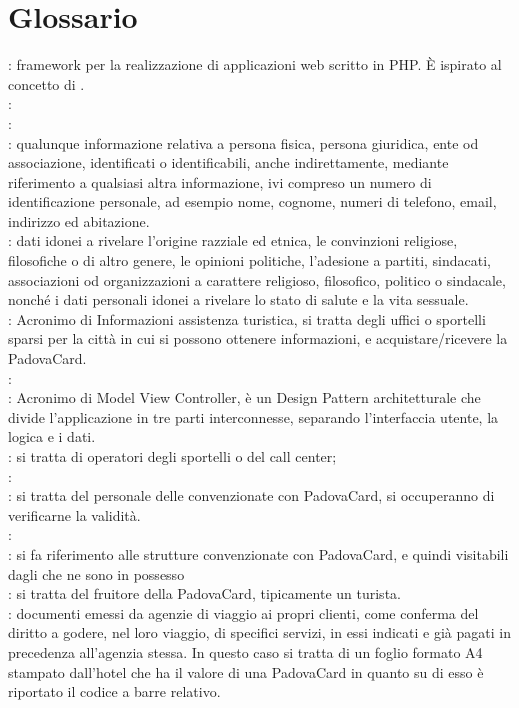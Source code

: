 \section{Glossario}
: framework per la realizzazione di applicazioni web scritto in PHP. È ispirato al concetto di . \\
:  \\
: \\
: qualunque informazione relativa a persona fisica, persona giuridica, ente od associazione, identificati o identificabili, anche indirettamente, mediante riferimento a qualsiasi altra informazione, ivi compreso un numero di identificazione personale, ad esempio nome, cognome, numeri di telefono, email, indirizzo ed abitazione. \\
: dati idonei a rivelare l'origine razziale ed etnica, le convinzioni religiose, filosofiche o di altro genere, le opinioni politiche, l'adesione a partiti, sindacati, associazioni od organizzazioni a carattere religioso, filosofico, politico o sindacale, nonché i dati personali idonei a rivelare lo stato di salute e la vita sessuale. \\
: Acronimo di Informazioni assistenza turistica, si tratta degli uffici o sportelli sparsi per la città in cui si possono ottenere informazioni, e acquistare/ricevere la PadovaCard. \\
: \\
: Acronimo di Model View Controller, è un Design Pattern architetturale che divide l’applicazione in tre parti interconnesse, separando l’interfaccia utente, la logica e i dati. \\
: si tratta di operatori degli sportelli  o del call center;\\
:  \\
: si tratta del personale delle  convenzionate con PadovaCard, si occuperanno di verificarne la validità. \\
: \\
: si fa riferimento alle strutture convenzionate con PadovaCard, e quindi visitabili dagli  che ne sono in possesso \\
: si tratta del fruitore della PadovaCard, tipicamente un turista.\\
: documenti emessi da agenzie di viaggio ai propri clienti, come conferma del diritto a godere, nel loro viaggio, di specifici servizi, in essi indicati e già pagati in precedenza all'agenzia stessa. In questo caso si tratta di un foglio formato A4 stampato dall'hotel che ha il valore di una PadovaCard in quanto su di esso è riportato il codice a barre relativo. \\
